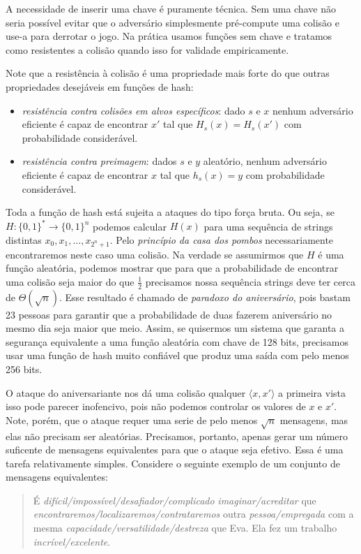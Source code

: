 A necessidade de inserir uma chave é puramente técnica.
Sem uma chave não seria possível evitar que o adversário simplesmente pré-compute uma colisão e use-a para derrotar o jogo.
Na prática usamos funções sem chave e tratamos como resistentes a colisão quando isso for validade empiricamente.

Note que a resistência à colisão é uma propriedade mais forte do que outras propriedades desejáveis em funções de hash:
\begin{itemize}
\item {\em resistência contra colisões em alvos específicos}: dado $s$ e $x$ nenhum adversário eficiente é capaz de encontrar $x'$ tal que $H_s(x) = H_s(x')$ com probabilidade considerável.
\item {\em resistência contra preimagem}: dados $s$ e $y$ aleatório, nenhum adversário eficiente é capaz de encontrar $x$ tal que $h_s(x) = y$ com probabilidade considerável. 
\end{itemize}

Toda a função de hash está sujeita a ataques do tipo força bruta.
Ou seja, se $H: \{0,1\}^* \to \{0,1\}^n$ podemos calcular $H(x)$ para uma sequência de strings distintas $x_0, x_1, \dots, x_{2^n+1}$.
Pelo {\em princípio da casa dos pombos} necessariamente encontraremos neste caso uma colisão.
Na verdade se assumirmos que $H$ é uma função aleatória, podemos mostrar que para que a probabilidade de encontrar uma colisão seja maior do que $\frac{1}{2}$ precisamos nossa sequência strings deve ter cerca de $\Theta(\sqrt{n})$.
Esse resultado é chamado de {\em paradoxo do aniversário}, pois bastam 23 pessoas para garantir que a probabilidade de duas fazerem aniversário no mesmo dia seja maior que meio.
Assim, se quisermos um sistema que garanta a segurança equivalente a uma função aleatória com chave de 128 bits, precisamos usar uma função de hash muito confiável que produz uma saída com pelo menos 256 bits.

O ataque do aniversariante nos dá uma colisão qualquer $\langle x, x' \rangle$ a primeira vista isso pode parecer inofencivo, pois não podemos controlar os valores de $x$ e  $x'$.
Note, porém, que o ataque requer uma serie de pelo menos $\sqrt{n}$ mensagens, mas elas não precisam ser aleatórias.
Precisamos, portanto, apenas gerar um número suficente de mensagens equivalentes para que o ataque seja efetivo.
Essa é uma tarefa relativamente simples.
Considere o seguinte exemplo de um conjunto de mensagens equivalentes:


\begin{quote}
  É {\em difícil/impossível/desafiador/complicado} {\em imaginar/acreditar} que {\em encontraremos/localizaremos/contrataremos} outra {\em pessoa/empregada} com a mesma {\em capacidade/versatilidade/destreza} que Eva.
Ela fez um trabalho {\em incrível/excelente}.
\end{quote}

